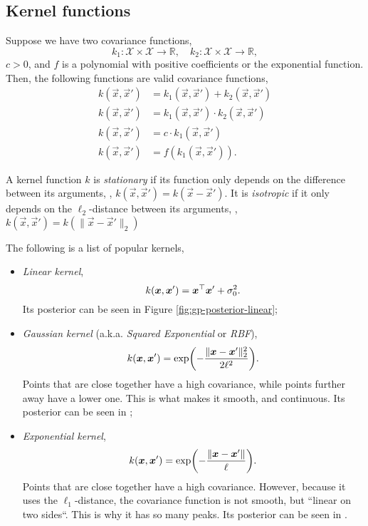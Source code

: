 \subsection{Kernel functions}

Suppose we have two covariance functions, \[
  k_1 : \mathcal{X} \times \mathcal{X} \to \mathbb{R}, \hspace{1em} k_2 :
  \mathcal{X} \times \mathcal{X} \to \mathbb{R}
,\]
$c>0$, and $f$ is a polynomial with positive coefficients or the exponential
function. Then, the following functions are valid covariance functions,
\begin{align*}
  k(\vec{x},\vec{x}') &= k_1(\vec{x},\vec{x}')+k_2(\vec{x},\vec{x}') \\
  k(\vec{x},\vec{x}') &= k_1(\vec{x},\vec{x}')\cdot k_2(\vec{x},\vec{x}') \\
  k(\vec{x},\vec{x}') &= c\cdot k_1(\vec{x},\vec{x}') \\
  k(\vec{x},\vec{x}') &= f(k_1(\vec{x},\vec{x}'))
.\end{align*}

\begin{definition}
  A kernel function $k$ is \textit{stationary} if its function only depends on
  the difference between its arguments, \ie,
  $k(\vec{x},\vec{x}')=k(\vec{x}-\vec{x}')$. It is \textit{isotropic} if it only
  depends on the $\ell_2$-distance between its arguments, \ie,
  $k(\vec{x},\vec{x}')=k(\lVert \vec{x}-\vec{x}' \rVert_2)$
\end{definition}

The following is a list of popular kernels,
\begin{itemize}
  \item \textit{Linear kernel}, \[
      k(\bm{x},\bm{x}') = \bm{x}^\top\bm{x}' + \sigma_0^2
    .\]
    Its posterior can be seen in Figure \ref{fig:gp-posterior-linear};

  \item \textit{Gaussian kernel} (a.k.a. \textit{Squared Exponential} or
    \textit{RBF}), \[
      k(\vec{x},\vec{x}') = \exp \lft( -\frac{\lVert \vec{x}-\vec{x}'
      \rVert^2_2}{2\ell^2} \rgt)
    .\]
    Points that are close together have a high covariance, while points further
    away have a lower one. This is what makes it smooth, and continuous. Its
    posterior can be seen in ;

  \item \textit{Exponential kernel}, \[
      k(\vec{x},\vec{x}') = \exp \lft( -\frac{\lVert \vec{x}-\vec{x}' \rVert}{\ell} \rgt)
    .\]
    Points that are close together have a high covariance. However, because it
    uses the $\ell_1$-distance, the covariance function is not smooth, but
    ``linear on two sides``.  This is why it has so many peaks. Its posterior
    can be seen in .
\end{itemize}

